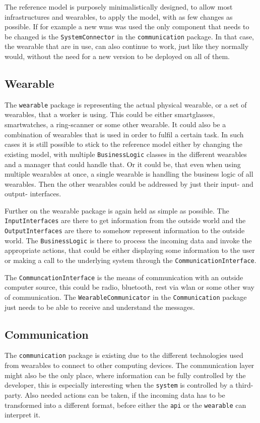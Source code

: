 The \gls{reference model} is purposely minimalistically designed, to allow most infrastructures and wearables, to apply the model, with as few changes as possible. If for example a new \gls{wms} was used the only component that needs to be changed is the \texttt{SystemConnector} in the \texttt{communication} package. In that case, the wearable that are in use, can also continue to work, just like they normally would, without the need for a new version to be deployed on all of them.

\subsection{Wearable}
The \texttt{\gls{wearable}} package is representing the actual physical wearable, or a set of wearables, that a worker is using. This could be either \gls{smartglasses}, \gls{smartwatch}es, a ring-scanner or some other \gls{wearable}. It could also be a combination of wearables that is used in order to fulfil a certain task. In such cases it is still possible to stick to the \gls{reference model} either by changing the existing model, with multiple \texttt{BusinessLogic} classes in the different wearables and a manager that could handle that. Or it could be, that even when using multiple wearables at once, a single wearable is handling the business logic of all wearables. Then the other wearables could be addressed by just their input- and output- interfaces.

Further on the wearable package is again held as simple as possible. The \texttt{InputInterfaces} are there to get information from the outside world and the \texttt{OutputInterfaces} are there to somehow represent information to the outside world. The \texttt{BusinessLogic} is there to process the incoming data and invoke the appropriate actions, that could be either displaying some information to the user or making a call to the underlying system through the \texttt{CommunicationInterface}.

The \texttt{CommuncationInterface} is the means of communication with an outside computer source, this could be radio, bluetooth, \gls{rest} via \gls{wlan} or some other way of communication. The \texttt{WearableCommunicator} in the \texttt{Communication} package just needs to be able to receive and understand the messages.
\subsection{Communication}\label{subsec:communication}
The \texttt{communication} package is existing due to the different technologies used from \gls{wearable}s to connect to other computing devices. The communication layer might also be the only place, where information can be fully controlled by the developer, this is especially interesting when the \texttt{system} is controlled by a third-party. Also needed actions can be taken, if the incoming data has to be transformed into a different format, before either the \texttt{\gls{api}} or the \texttt{wearable} can interpret it. 

